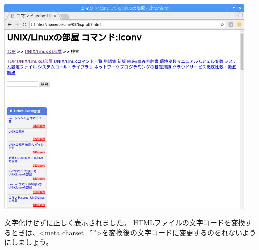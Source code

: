 \begin{center}
\includegraphics[width=0.95\textwidth]{./text08-img/textbook-img027.png}

\end{center}


\bigskip


\bigskip

文字化けせずに正しく表示されました。
HTMLファイルの文字コードを変換するときは、{\textless}meta
charset=””{\textgreater}を変換後の文字コードに変更するのをれないようにしましょう。
